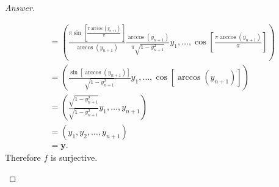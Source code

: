 \documentclass[12pt]{article}
\newcommand\paren[1]{\left( #1 \right)}
\newcommand{\sqbrack}[1]{\left [ #1 \right ]}
\theoremstyle{definition}
\begin{document}
\begin{proof}[Answer]
\begin{enumerate}[(a)]
\begin{align*}
            & = \paren{ \frac{ \pi \sin \sqbrack{ \frac{\pi\arccos \paren{ y_{n+1} }}{\pi} } }{\arccos \paren{ y_{n+1} }} \frac{\arccos\paren{y_{n+1}}}{\pi \sqrt{1-y_{n+1}^2}} y_1, \dotsc , \cos \sqbrack{ \frac{\pi \arccos \paren{ y_{n+1} }}{ \pi } } } \\
            & = \paren{ \frac{ \sin \sqbrack{ \arccos \paren{ y_{n+1} } } }{ \sqrt{1 - y_{n+1}^2 } } y_1 , \dotsc , \cos \sqbrack{ \arccos \paren{ y_{n+1} } } } \\
            & = \paren{ \frac{\sqrt{1 - y_{n+1}^2 }}{\sqrt{1 - y_{n+1}^2 }} y_1 , \dotsc , y_{n+1} } \\
            & = \paren{ y_1 , y_2 , \dotsc , y_{n+1} } \\
            & = \mathbf{y}.
        \end{align*}
        Therefore $f$ is surjective.
        

\end{enumerate}
\end{proof}
\end{document}
